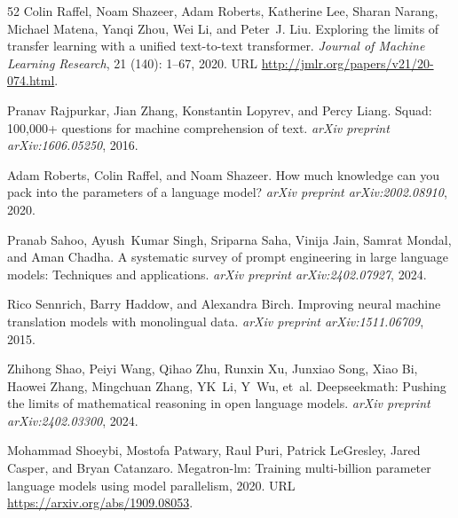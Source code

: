 \begin{thebibliography}{52}
Colin Raffel, Noam Shazeer, Adam Roberts, Katherine Lee, Sharan Narang, Michael Matena, Yanqi Zhou, Wei Li, and Peter~J. Liu.
\newblock Exploring the limits of transfer learning with a unified text-to-text transformer.
\newblock \emph{Journal of Machine Learning Research}, 21 (140): 1--67, 2020.
\newblock URL \url{http://jmlr.org/papers/v21/20-074.html}.

Pranav Rajpurkar, Jian Zhang, Konstantin Lopyrev, and Percy Liang.
\newblock Squad: 100,000+ questions for machine comprehension of text.
\newblock \emph{arXiv preprint arXiv:1606.05250}, 2016.

Adam Roberts, Colin Raffel, and Noam Shazeer.
\newblock How much knowledge can you pack into the parameters of a language model?
\newblock \emph{arXiv preprint arXiv:2002.08910}, 2020.

Pranab Sahoo, Ayush~Kumar Singh, Sriparna Saha, Vinija Jain, Samrat Mondal, and Aman Chadha.
\newblock A systematic survey of prompt engineering in large language models: Techniques and applications.
\newblock \emph{arXiv preprint arXiv:2402.07927}, 2024.

Rico Sennrich, Barry Haddow, and Alexandra Birch.
\newblock Improving neural machine translation models with monolingual data.
\newblock \emph{arXiv preprint arXiv:1511.06709}, 2015.

Zhihong Shao, Peiyi Wang, Qihao Zhu, Runxin Xu, Junxiao Song, Xiao Bi, Haowei Zhang, Mingchuan Zhang, YK~Li, Y~Wu, et~al.
\newblock Deepseekmath: Pushing the limits of mathematical reasoning in open language models.
\newblock \emph{arXiv preprint arXiv:2402.03300}, 2024.

Mohammad Shoeybi, Mostofa Patwary, Raul Puri, Patrick LeGresley, Jared Casper, and Bryan Catanzaro.
\newblock Megatron-lm: Training multi-billion parameter language models using model parallelism, 2020.
\newblock URL \url{https://arxiv.org/abs/1909.08053}.


\end{thebibliography}

